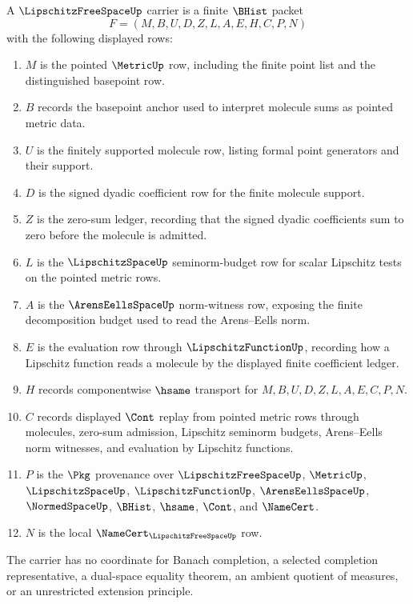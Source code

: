 \begin{definition}
\label{def:lipschitz-free-space-carrier}
A $\LipschitzFreeSpaceUp$ carrier is a finite $\BHist$ packet
$$
F=(M,B,U,D,Z,L,A,E,H,C,P,N)
$$
with the following displayed rows:
\begin{enumerate}
\item $M$ is the pointed $\MetricUp$ row, including the finite point list and the distinguished basepoint row.
\item $B$ records the basepoint anchor used to interpret molecule sums as pointed metric data.
\item $U$ is the finitely supported molecule row, listing formal point generators and their support.
\item $D$ is the signed dyadic coefficient row for the finite molecule support.
\item $Z$ is the zero-sum ledger, recording that the signed dyadic coefficients sum to zero before the molecule is admitted.
\item $L$ is the $\LipschitzSpaceUp$ seminorm-budget row for scalar Lipschitz tests on the pointed metric rows.
\item $A$ is the $\ArensEellsSpaceUp$ norm-witness row, exposing the finite decomposition budget used to read the Arens--Eells norm.
\item $E$ is the evaluation row through $\LipschitzFunctionUp$, recording how a Lipschitz function reads a molecule by the displayed finite coefficient ledger.
\item $H$ records componentwise $\hsame$ transport for $M,B,U,D,Z,L,A,E,C,P,N$.
\item $C$ records displayed $\Cont$ replay from pointed metric rows through molecules, zero-sum admission, Lipschitz seminorm budgets, Arens--Eells norm witnesses, and evaluation by Lipschitz functions.
\item $P$ is the $\Pkg$ provenance over $\LipschitzFreeSpaceUp$, $\MetricUp$, $\LipschitzSpaceUp$, $\LipschitzFunctionUp$, $\ArensEellsSpaceUp$, $\NormedSpaceUp$, $\BHist$, $\hsame$, $\Cont$, and $\NameCert$.
\item $N$ is the local $\NameCert_{\LipschitzFreeSpaceUp}$ row.
\end{enumerate}
The carrier has no coordinate for Banach completion, a selected completion representative, a dual-space equality theorem, an ambient quotient of measures, or an unrestricted extension principle.
\end{definition}

